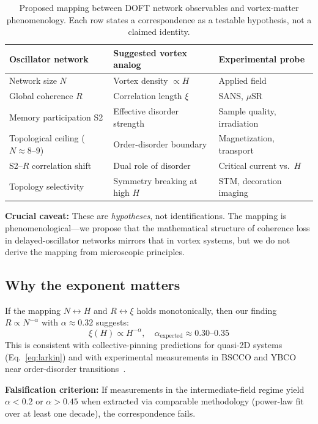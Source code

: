 \documentclass[reprint,aps,prb,superscriptaddress,floatfix]{revtex4-2}
\begin{document}
\begin{table}[t]
\centering
\caption{Proposed mapping between DOFT network observables and vortex-matter phenomenology. Each row states a correspondence as a testable hypothesis, not a claimed identity.}
\label{tab:mapping}
\begin{tabular}{@{}lll@{}}
\toprule
\textbf{Oscillator network} & \textbf{Suggested vortex analog} & \textbf{Experimental probe} \\
\midrule
Network size $N$ & Vortex density $\propto H$ & Applied field \\
Global coherence $R$ & Correlation length $\xi$ & SANS, $\mu$SR \\
Memory participation S2 & Effective disorder strength & Sample quality, irradiation \\
Topological ceiling ($N \approx 8$--$9$) & Order-disorder boundary & Magnetization, transport \\
S2--$R$ correlation shift & Dual role of disorder & Critical current vs.~$H$ \\
Topology selectivity & Symmetry breaking at high $H$ & STM, decoration imaging \\
\bottomrule
\end{tabular}
\end{table}

\textbf{Crucial caveat:} These are \emph{hypotheses}, not identifications. The mapping is phenomenological---we propose that the mathematical structure of coherence loss in delayed-oscillator networks mirrors that in vortex systems, but we do not derive the mapping from microscopic principles.

\subsection{Why the exponent matters}

If the mapping $N \leftrightarrow H$ and $R \leftrightarrow \xi$ holds monotonically, then our finding $R \propto N^{-\alpha}$ with $\alpha \approx 0.32$ suggests:
\begin{equation}
\xi(H) \propto H^{-\alpha}, \quad \alpha_{\mathrm{expected}} \approx 0.30\text{--}0.35
\label{eq:prediction}
\end{equation}
This is consistent with collective-pinning predictions for quasi-2D systems (Eq.~\ref{eq:larkin}) and with experimental measurements in BSCCO and YBCO near order-disorder transitions~\cite{Cubitt1993,Lee1993}.

\textbf{Falsification criterion:} If measurements in the intermediate-field regime yield $\alpha < 0.2$ or $\alpha > 0.45$ when extracted via comparable methodology (power-law fit over at least one decade), the correspondence fails.
\end{document}
